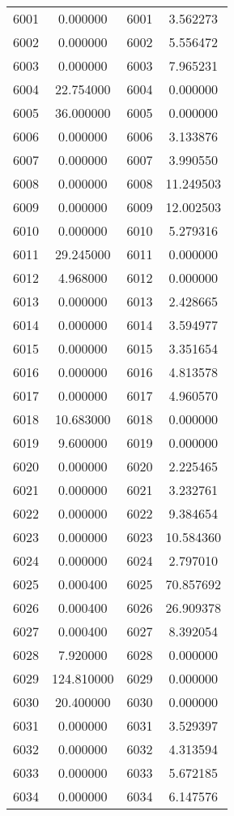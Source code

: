 \documentclass[12pt]{article}
\begin{document}
\begin{longtable}{@{}cccc@{}}
6001 & 0.000000 & 6001 & 3.562273 \\
6002 & 0.000000 & 6002 & 5.556472 \\
6003 & 0.000000 & 6003 & 7.965231 \\
6004 & 22.754000 & 6004 & 0.000000 \\
6005 & 36.000000 & 6005 & 0.000000 \\
6006 & 0.000000 & 6006 & 3.133876 \\
6007 & 0.000000 & 6007 & 3.990550 \\
6008 & 0.000000 & 6008 & 11.249503 \\
6009 & 0.000000 & 6009 & 12.002503 \\
6010 & 0.000000 & 6010 & 5.279316 \\
6011 & 29.245000 & 6011 & 0.000000 \\
6012 & 4.968000 & 6012 & 0.000000 \\
6013 & 0.000000 & 6013 & 2.428665 \\
6014 & 0.000000 & 6014 & 3.594977 \\
6015 & 0.000000 & 6015 & 3.351654 \\
6016 & 0.000000 & 6016 & 4.813578 \\
6017 & 0.000000 & 6017 & 4.960570 \\
6018 & 10.683000 & 6018 & 0.000000 \\
6019 & 9.600000 & 6019 & 0.000000 \\
6020 & 0.000000 & 6020 & 2.225465 \\
6021 & 0.000000 & 6021 & 3.232761 \\
6022 & 0.000000 & 6022 & 9.384654 \\
6023 & 0.000000 & 6023 & 10.584360 \\
6024 & 0.000000 & 6024 & 2.797010 \\
6025 & 0.000400 & 6025 & 70.857692 \\
6026 & 0.000400 & 6026 & 26.909378 \\
6027 & 0.000400 & 6027 & 8.392054 \\
6028 & 7.920000 & 6028 & 0.000000 \\
6029 & 124.810000 & 6029 & 0.000000 \\
6030 & 20.400000 & 6030 & 0.000000 \\
6031 & 0.000000 & 6031 & 3.529397 \\
6032 & 0.000000 & 6032 & 4.313594 \\
6033 & 0.000000 & 6033 & 5.672185 \\
6034 & 0.000000 & 6034 & 6.147576 \\

\end{longtable}
\end{document}
